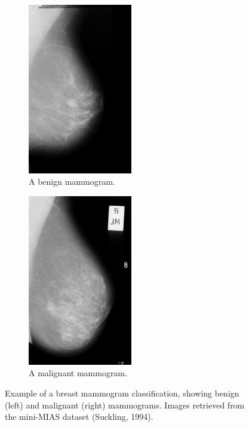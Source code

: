 \begin{figure}[h]
\centering
\begin{subfigure}{.5\textwidth}
  \centering
  \includegraphics[width=0.5\textwidth]{figures/litsurvey/classification_benign.png}
  \caption{A benign mammogram.}
  \label{fig:classification_benign}
\end{subfigure}%
\begin{subfigure}{.5\textwidth}
  \centering
  \includegraphics[width=0.5\textwidth]{figures/litsurvey/classification_malignant.png}
  \caption{A malignant mammogram.}
  \label{fig:classification_malignant}
\end{subfigure}
\caption{\label{fig:classification_example}Example of a breast mammogram classification, showing benign (left) and malignant (right) mammograms. Images retrieved from the mini-MIAS dataset (Suckling, 1994).}
\end{figure}

